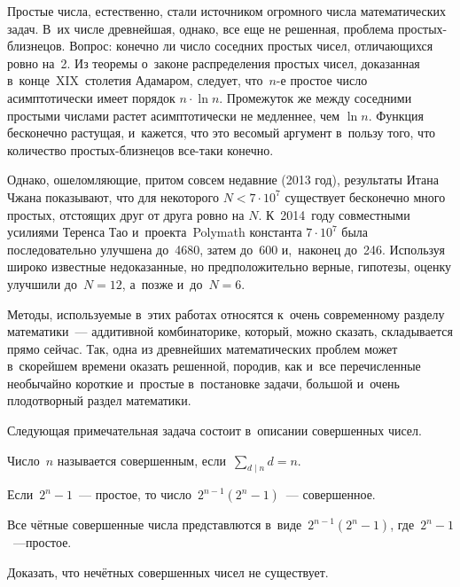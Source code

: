 \documentclass{article}
\begin{document}
Простые числа, естественно, стали источником огромного числа математических
задач. В~их числе древнейшая, однако, все еще не решенная, проблема
простых-близнецов. Вопрос: конечно ли число соседних простых чисел,
отличающихся ровно на~2. Из теоремы о~законе распределения простых чисел,
доказанная в~конце~XIX~столетия Адамаром, следует, что~$n$-е простое число
асимптотически имеет порядок $n \cdot \ln n$. Промежуток же между соседними
простыми числами растет асимптотически не медленнее, чем $\ln n$. Функция
бесконечно растущая, и~кажется, что это весомый аргумент в~пользу того, что
количество простых-близнецов все-таки конечно.

Однако, ошеломляющие, притом совсем недавние (2013 год), результаты Итана Чжана
показывают, что для некоторого $N < 7 \cdot 10^7$ существует бесконечно много
простых, отстоящих друг от друга ровно на $N$. К~2014~году совместными усилиями
Теренса Тао и~проекта~Polymath константа $7 \cdot 10^7$ была последовательно
улучшена до~4680, затем до~600 и,~наконец до~246. Используя широко известные
недоказанные, но предположительно верные, гипотезы, оценку улучшили до~$N=12$,
а~позже и~до~$N=6$.

Методы, используемые в~этих работах относятся к~очень современному разделу
математики~--- аддитивной комбинаторике, который, можно сказать, складывается
прямо сейчас. Так, одна из древнейших математических проблем может в~скорейшем
времени оказать решенной, породив, как и~все перечисленные необычайно короткие
и~простые в~постановке задачи, большой и~очень плодотворный раздел математики.

Следующая примечательная задача состоит в~описании совершенных чисел.

\begin{definition}
  Число~$n$ называется совершенным, если~$\sum\limits_{d \mid n} d = n$.
\end{definition}

\begin{exercise}[простое]
  Если~$2^n - 1$~--- простое, то число~$2^{n-1} (2^n - 1)$~--- совершенное.
\end{exercise}
\begin{exercise}[посложнее]
  Все чётные совершенные числа представлются в~виде~$2^{n-1} (2^n - 1)$,
  где~$2^n - 1$~---простое.
\end{exercise}
\begin{exercise}
  Доказать, что нечётных совершенных чисел не существует.
\end{exercise}
\end{document}
